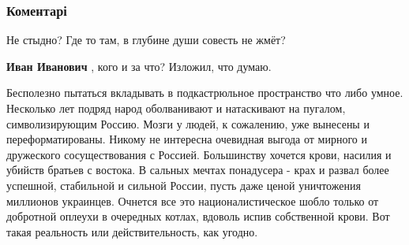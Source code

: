  
 
 
 
 
\subsubsection{Коментарі}

\begin{itemize} %
 
Не стыдно? Где то там, в глубине души совесть не жмёт?

\begin{itemize} %
 
\textbf{Иван Иванович} , кого и за что? Изложил, что думаю.
\end{itemize} %

 

Бесполезно пытаться вкладывать в подкастрюльное пространство что либо умное.
Несколько лет подряд народ оболванивают и натаскивают на пугалом,
символизирующим Россию.  Мозги у людей, к сожалению, уже вынесены и
переформатированы. Никому не интересна очевидная выгода от мирного и дружеского
сосуществования с Россией. Большинству хочется крови, насилия и убийств братьев
с востока. В сальных мечтах понадусера - крах и развал более успешной,
стабильной и сильной России, пусть даже ценой уничтожения миллионов украинцев.
Очнется все это националистическое шобло только от добротной оплеухи в
очередных котлах, вдоволь испив собственной крови.  Вот такая реальность или
действительность, как угодно.


\end{itemize}
